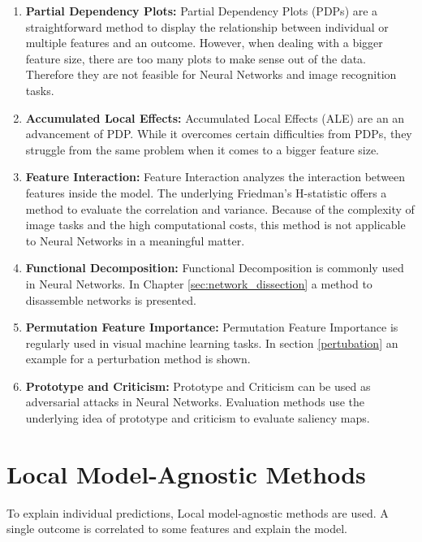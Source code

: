 \begin{enumerate}
	\item \textbf{Partial Dependency Plots:} Partial Dependency Plots (PDPs) are a straightforward method to display the relationship between individual or multiple features and an outcome. However, when dealing with a bigger feature size, there are too many plots to make sense out of the data. Therefore they are not feasible for Neural Networks and image recognition tasks.
	\item \textbf{Accumulated Local Effects:} Accumulated Local Effects (ALE) are an an advancement of PDP. While it overcomes certain difficulties from PDPs, they struggle from the same problem when it comes to a bigger feature size.
	\item \textbf{Feature Interaction:} Feature Interaction analyzes the interaction between features inside the model. The underlying Friedman's H-statistic offers a method to evaluate the correlation and variance. Because of the complexity of image tasks and the high computational costs, this method is not applicable to Neural Networks in a meaningful matter.
	\item \textbf{Functional Decomposition:} Functional Decomposition is commonly used in Neural Networks. In Chapter \ref{sec:network_dissection} a method to disassemble networks is presented.
	\item \textbf{Permutation Feature Importance:} Permutation Feature Importance is regularly used in visual machine learning tasks. In section \ref{pertubation} an example for a perturbation method is shown.
	\item \textbf{Prototype and Criticism:} Prototype and Criticism can be used as adversarial attacks in Neural Networks. \cite{xu2019adversarial} Evaluation methods use the underlying idea of prototype and criticism to evaluate saliency maps.
	
\end{enumerate}


\section{Local Model-Agnostic Methods}

To explain individual predictions, Local model-agnostic methods are used. A single outcome is correlated to some features and explain the model.


